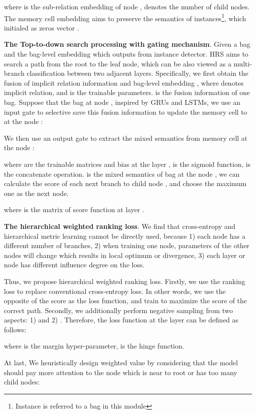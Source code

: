 \documentclass{article}
\begin{document}
where  is the sub-relation embedding of node ,  denotes the number of child nodes. The memory cell embedding aims to preserve the semantics of instances\footnote{Instance is referred to a bag in this module}, which initialed as zeros vector .

\textbf{The Top-to-down search processing with gating mechanism}.
Given a bag  and the bag-level embedding  which outputs from instance detector. HRS aims to search a path from the root to the leaf node, which can be also viewed as a multi-branch classification between two adjacent layers. Specifically, we first obtain the fusion of implicit relation information and bag-level embedding , where  denotes implicit relation,  and  is the trainable parameters.  is the fusion information of one bag. Suppose that the bag at node , inspired by GRUs and LSTMs, we use an input gate  to selective save this fusion information to update the memory cell  to  at the node :


We then use an output gate  to extract the mixed semantics from memory cell at the node :


where  are the trainable matrices and bias at the layer ,  is the sigmoid function,  is the concatenate operation.  is the mixed semantics of bag  at the node , we can calculate the score of each next branch to child node , and choose the maximum one  as the next node.


where  is the matrix of score function  at layer .


\textbf{The hierarchical weighted ranking loss}. We find that cross-entropy and hierarchical metric learning \cite{verma2012learning} cannot be directly used, because 1) each node has a different number of branches, 2) when training one node, parameters of the other nodes will change which results in local optimum or divergence, 3) each layer or node has different influence degree on the loss.

Thus, we propose hierarchical weighted ranking loss. Firstly, we use the ranking loss to replace conventional cross-entropy loss. In other words, we use the opposite of the score as the loss function, and train to maximize the score of the correct path. Secondly, we additionally perform negative sampling from two aspects: 1)  and 2) . Therefore, the loss function at the layer  can be defined as follows:

where  is the margin hyper-parameter,  is the hinge function. 

At last, We heuristically design weighted value by considering that the model should pay more attention to the node which is near to root or has too many child nodes:
\end{document}
